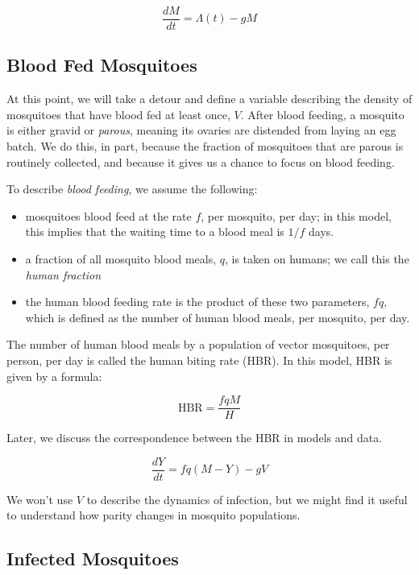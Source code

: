 \documentclass[
]{book}
\begin{document}
\begin{equation}
\frac{dM}{dt} = \Lambda(t) - g M
\end{equation}

\subsection{Blood Fed Mosquitoes}\label{blood-fed-mosquitoes}

At this point, we will take a detour and define a variable describing the density of mosquitoes that have blood fed at least once, \(V\). After blood feeding, a mosquito is either gravid or \emph{parous}, meaning its ovaries are distended from laying an egg batch. We do this, in part, because the fraction of mosquitoes that are parous is routinely collected, and because it gives us a chance to focus on blood feeding.

To describe \emph{blood feeding}, we assume the following:

\begin{itemize}
\item
  mosquitoes blood feed at the rate \(f\), per mosquito, per day; in this model, this implies that the waiting time to a blood meal is \(1/f\) days.
\item
  a fraction of all mosquito blood meals, \(q\), is taken on humans; we call this the \emph{human fraction}
\item
  the human blood feeding rate is the product of these two parameters, \(fq\), which is defined as the number of human blood meals, per mosquito, per day.
\end{itemize}

The number of human blood meals by a population of vector mosquitoes, per person, per day is called the human biting rate (HBR). In this model, HBR is given by a formula:

\[\mbox{HBR} = \frac{fqM}{H}\]

Later, we discuss the correspondence between the HBR in models and data.

\begin{equation}
\frac{dY}{dt} = f q (M-Y) - g V
\end{equation}

We won't use \(V\) to describe the dynamics of infection, but we might find it useful to understand how parity changes in mosquito populations.

\subsection{Infected Mosquitoes}\label{infected-mosquitoes}
\end{document}
